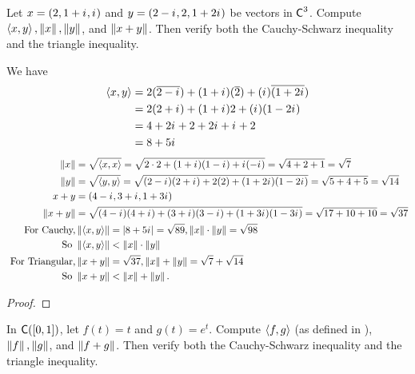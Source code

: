 \begin{exercise} \label{exercise 6.1.2}
Let \(x = (2, 1 + {i\mkern1mu}, {i\mkern1mu})\) and \(y = (2 - {i\mkern1mu}, 2, 1 + 2{i\mkern1mu})\) be vectors in \(\textsf{C}^3\).
Compute \(\left< x, y \right>, \left\lVert x\right\rVert, \left\lVert y\right\rVert\), and \(\left\lVert x + y\right\rVert\).
Then verify both the Cauchy-Schwarz inequality and the triangle inequality.
\end{exercise}
We have
\begin{align*}
    \left< x, y \right> & = 2(\overline{2-{i\mkern1mu}}) + (1+{i\mkern1mu})(\overline{2}) + ({i\mkern1mu}) \overline{(1 + 2 {i\mkern1mu}}) \\
    & = 2(2 + {i\mkern1mu}) + (1 + {i\mkern1mu}) 2 + ({i\mkern1mu})(1 - 2{i\mkern1mu}) \\
    & = 4 + 2{i\mkern1mu} + 2 + 2{i\mkern1mu} + {i\mkern1mu} + 2 \\
    & = 8 + 5{i\mkern1mu}
\end{align*}
\begin{align*}
    \left\lVert x\right\rVert &= \sqrt{\left< x, x \right>} = \sqrt{2 \cdot 2 + (1+{i\mkern1mu})(1-{i\mkern1mu}) + {i\mkern1mu}(-{i\mkern1mu})} = \sqrt{4 + 2 + 1}= \sqrt{7} \\
    \left\lVert y\right\rVert &= \sqrt{\left< y, y \right>} = \sqrt{(2-{i\mkern1mu})(2+{i\mkern1mu}) + 2(2) + (1 + 2{i\mkern1mu})(1 - 2{i\mkern1mu})} = \sqrt{5 + 4 + 5} = \sqrt{14} \\
    x + y &= (4 - {i\mkern1mu}, 3 + {i\mkern1mu}, 1 + 3{i\mkern1mu}) \\
    \left\lVert x + y\right\rVert & = \sqrt{(4-{i\mkern1mu})(4 + {i\mkern1mu}) + (3 + {i\mkern1mu})(3 - {i\mkern1mu}) + (1 + 3{i\mkern1mu})(1 - 3{i\mkern1mu})} = \sqrt{17 + 10 + 10} = \sqrt{37} \\
    \text { For Cauchy,} & \left\lVert\left< x, y \right>\right\rVert = \lvert8 + 5{i\mkern1mu}\rvert = \sqrt{89}, \left\lVert x\right\rVert \cdot \left\lVert y\right\rVert = \sqrt{98} \\
    \text { So } & \left\lVert\left< x, y \right>\right\rVert < \left\lVert x\right\rVert \cdot \left\lVert y\right\rVert \\
    \text { For Triangular,} & \left\lVert x + y\right\rVert = \sqrt{37}, \left\lVert x\right\rVert + \left\lVert y\right\rVert = \sqrt{7} + \sqrt{14} \\
    \text{ So } & \left\lVert x + y\right\rVert < \left\lVert x\right\rVert + \left\lVert y\right\rVert.
\end{align*}
\begin{proof}
\end{proof}

\begin{exercise} \label{exercise 6.1.3}
In \(\textsf{C}([0, 1])\), let \(f(t) = t\) and \(g(t) = e^t\).
Compute \(\left< f, g \right>\) (as defined in ), \(\left\lVert f\right\rVert, \left\lVert g\right\rVert\), and \(\left\lVert f + g\right\rVert\). Then verify both the Cauchy-Schwarz inequality and the triangle inequality.
\end{exercise}

